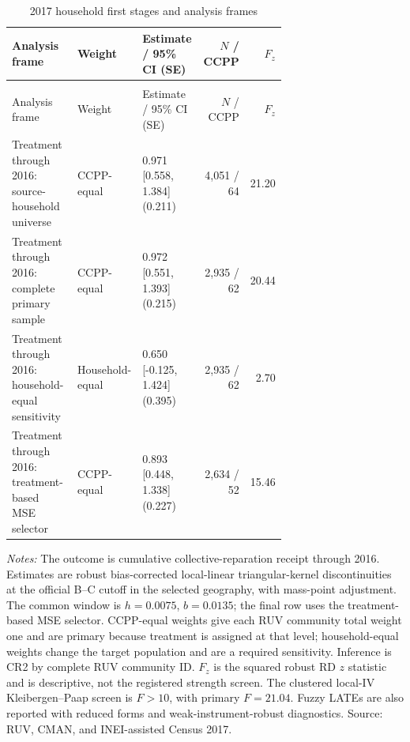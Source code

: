 \begingroup\fontsize{9.25}{11.4}\selectfont
\setlength{\tabcolsep}{3pt}\renewcommand{\arraystretch}{1.18}
\begin{longtable}{@{}>{\raggedright\arraybackslash}p{0.31\linewidth}p{0.14\linewidth}p{0.24\linewidth}rr@{}}
\caption{2017 household first stages and analysis frames}\label{tab:pub_A20} \\
\toprule Analysis frame & Weight & Estimate / 95\% CI (SE) & \(N\) / CCPP & \(F_z\) \\ \midrule\endfirsthead
\multicolumn{5}{c}{\tablename\ \thetable{} -- continued} \\
\toprule Analysis frame & Weight & Estimate / 95\% CI (SE) & \(N\) / CCPP & \(F_z\) \\ \midrule\endhead
Treatment through 2016: source-household universe & CCPP-equal & \shortstack[r]{0.971 \\{} [0.558, 1.384] \\{} (0.211)} & 4,051 / 64 & 21.20 \\
Treatment through 2016: complete primary sample & CCPP-equal & \shortstack[r]{0.972 \\{} [0.551, 1.393] \\{} (0.215)} & 2,935 / 62 & 20.44 \\
Treatment through 2016: household-equal sensitivity & Household-equal & \shortstack[r]{0.650 \\{} [-0.125, 1.424] \\{} (0.395)} & 2,935 / 62 & 2.70 \\
Treatment through 2016: treatment-based MSE selector & CCPP-equal & \shortstack[r]{0.893 \\{} [0.448, 1.338] \\{} (0.227)} & 2,634 / 52 & 15.46 \\
\bottomrule\end{longtable}
\parbox{0.97\linewidth}{\footnotesize \textit{Notes:} The outcome is cumulative collective-reparation receipt through 2016. Estimates are robust bias-corrected local-linear triangular-kernel discontinuities at the official B--C cutoff in the selected geography, with mass-point adjustment. The common window is \(h=0.0075\), \(b=0.0135\); the final row uses the treatment-based MSE selector. CCPP-equal weights give each RUV community total weight one and are primary because treatment is assigned at that level; household-equal weights change the target population and are a required sensitivity. Inference is CR2 by complete RUV community ID. \(F_z\) is the squared robust RD \(z\) statistic and is descriptive, not the registered strength screen. The clustered local-IV Kleibergen--Paap screen is \(F>10\), with primary \(F=21.04\). Fuzzy LATEs are also reported with reduced forms and weak-instrument-robust diagnostics. Source: RUV, CMAN, and INEI-assisted Census 2017.}
